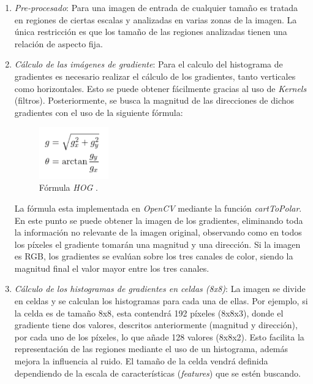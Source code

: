 \begin{enumerate}
	\item \textit{Pre-procesado}: Para una imagen de entrada de cualquier tamaño es tratada en regiones de ciertas escalas y analizadas en varias zonas de la imagen. La única restricción es que los tamaño de las regiones analizadas tienen una relación de aspecto fija.
	
	\item \textit{Cálculo de las imágenes de gradiente}: Para el calculo del histograma de gradientes es necesario realizar el cálculo de los gradientes, tanto verticales como horizontales. Esto se puede obtener fácilmente gracias al uso de \textit{Kernels} (filtros). Posteriormente, se busca la magnitud de las direcciones de dichos gradientes con el uso de la siguiente fórmula:
	
	\begin{figure}[htp]
		\centering
		\includegraphics[width=3cm]{imagenes/HOGFormula.png}
		\caption{Fórmula \textit{HOG} \cite{hog2}.}
		\label{fig:hogf}
	\end{figure}
	
	La fórmula esta implementada en \textit{OpenCV} mediante la función \textit{cartToPolar}. En este punto se puede obtener la imagen de los gradientes, eliminando toda la información no relevante de la imagen original, observando como en todos los píxeles el gradiente tomarán una magnitud y una dirección. Si la imagen es RGB, los gradientes se evalúan sobre los tres canales de color, siendo la magnitud final el valor mayor entre los tres canales.
	
	\item \textit{Cálculo de los histogramas de gradientes en celdas (8x8)}: La imagen se divide en celdas y se calculan los histogramas para cada una de ellas. Por ejemplo, si la celda es de tamaño 8x8, esta contendrá 192 píxeles (8x8x3), donde el gradiente tiene dos valores, descritos anteriormente (magnitud y dirección), por cada uno de los píxeles, lo que añade 128 valores (8x8x2). Esto facilita la representación de las regiones mediante el uso de un histograma, además mejora la influencia al ruido. El tamaño de la celda vendrá definida dependiendo de la escala de características (\textit{features}) que se estén buscando.
	

\end{enumerate}
